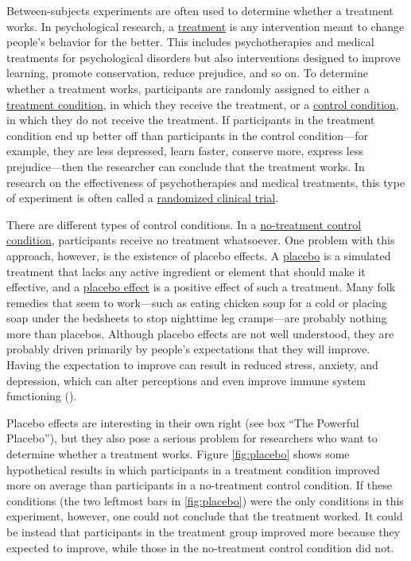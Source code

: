 \documentclass[
]{krantz}
\begin{document}
Between-subjects experiments are often used to determine whether a treatment works. In psychological research, a \hyperref[treatment]{treatment} is any intervention meant to change people's behavior for the better. This includes psychotherapies and medical treatments for psychological disorders but also interventions designed to improve learning, promote conservation, reduce prejudice, and so on. To determine whether a treatment works, participants are randomly assigned to either a \hyperref[treatment-condition]{treatment condition}, in which they receive the treatment, or a \hyperref[control-condition]{control condition}, in which they do not receive the treatment. If participants in the treatment condition end up better off than participants in the control condition---for example, they are less depressed, learn faster, conserve more, express less prejudice---then the researcher can conclude that the treatment works. In research on the effectiveness of psychotherapies and medical treatments, this type of experiment is often called a \hyperref[randomized-clinical-trial]{randomized clinical trial}.

There are different types of control conditions. In a \hyperref[no-treatment-control-condition]{no-treatment control condition}, participants receive no treatment whatsoever. One problem with this approach, however, is the existence of placebo effects. A \hyperref[placebo]{placebo} is a simulated treatment that lacks any active ingredient or element that should make it effective, and a \hyperref[placebo-effect]{placebo effect} is a positive effect of such a treatment. Many folk remedies that seem to work---such as eating chicken soup for a cold or placing soap under the bedsheets to stop nighttime leg cramps---are probably nothing more than placebos. Although placebo effects are not well understood, they are probably driven primarily by people's expectations that they will improve. Having the expectation to improve can result in reduced stress, anxiety, and depression, which can alter perceptions and even improve immune system functioning ().

Placebo effects are interesting in their own right (see box ``The Powerful Placebo''), but they also pose a serious problem for researchers who want to determine whether a treatment works. Figure \ref{fig:placebo} shows some hypothetical results in which participants in a treatment condition improved more on average than participants in a no-treatment control condition. If these conditions (the two leftmost bars in \ref{fig:placebo}) were the only conditions in this experiment, however, one could not conclude that the treatment worked. It could be instead that participants in the treatment group improved more because they expected to improve, while those in the no-treatment control condition did not.
\end{document}
